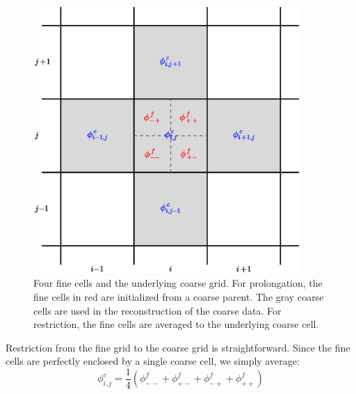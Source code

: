 \begin{figure}[h]
\centering
\includegraphics[width=4.0in]{2dgrid-prolong}
\caption[The geometry for 2-d
  prolongation.]{\label{fig:2dgrid-prolong} Four fine cells and the
  underlying coarse grid.  For prolongation, the fine cells in red are
  initialized from a coarse parent.  The gray coarse cells are used in
  the reconstruction of the coarse data.  For restriction, the fine
  cells are averaged to the underlying coarse cell.}
\end{figure}

Restriction from the fine grid to the coarse grid is straightforward.
Since the fine cells are perfectly enclosed by a single coarse cell,
we simply average:
\begin{equation}
\phi_{i,j}^c = \frac{1}{4} ( \phi_{--}^f + \phi_{+-}^f +
                             \phi_{-+}^f + \phi_{++}^f )
\end{equation}

